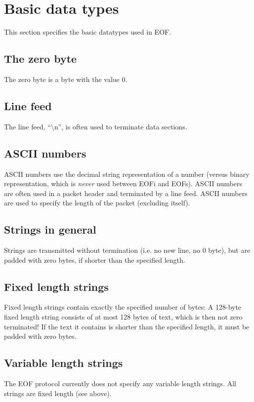 \documentclass[12pt,a4paper]{book}
\begin{document}
\section{Basic data types}
This section specifies the basic datatypes used in EOF.
\subsection{The zero byte}
The zero byte is a byte with the value 0.
\subsection{Line feed}
The line feed, "`\textbackslash{}n"', is often used to terminate data
sections.
\subsection{ASCII numbers}
ASCII numbers use the decimal string representation of a number (versus
binary representation, which is \emph{never} used between EOFi and EOFs).
ASCII numbers are often used in a packet header and terminated by a
line feed. ASCII numbers are used to specify the length of the packet
(excluding itself).
\subsection{Strings in general}
Strings are transmitted without termination (i.e. no new line, no 0 byte),
but are padded with zero bytes, if shorter than the specified length.
\subsection{Fixed length strings}
Fixed length strings contain exactly the specified number of bytes:
A 128-byte fixed length string consists of at most 128 bytes of text,
which is then not zero terminated!
If the text it contains is shorter than the specified length,
it must be padded with zero bytes.
\subsection{Variable length strings}
The EOF protocol currently does not specify any variable length strings.
All strings are fixed length (see above).
\end{document}
